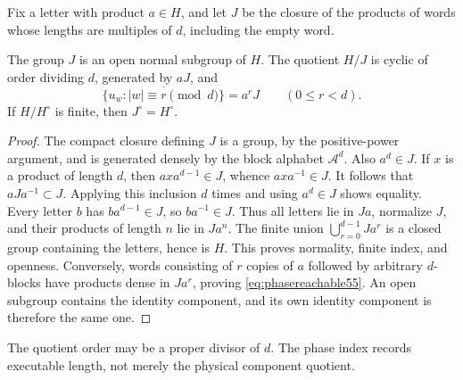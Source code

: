Fix a letter with product $a\in H$, and let $J$ be the closure of the products of words whose lengths are multiples of $d$, including the empty word.
\begin{lemma}\label{lem:phasegroup55}
The group $J$ is an open normal subgroup of $H$. The quotient $H/J$ is cyclic of order dividing $d$, generated by $aJ$, and
\begin{equation}\label{eq:phasereachable55}
 \overline{\{u_w:|w|\equiv r\pmod d\}}=a^rJ
 \qquad(0\le r<d).
\end{equation}
If $H/H^\circ$ is finite, then $J^\circ=H^\circ$.
\end{lemma}
\begin{proof}
The compact closure defining $J$ is a group, by the positive-power argument, and is generated densely by the block alphabet $\mathcal A^d$. Also $a^d\in J$. If $x$ is a product of length $d$, then $axa^{d-1}\in J$, whence $axa^{-1}\in J$. It follows that $aJa^{-1}\subset J$. Applying this inclusion $d$ times and using $a^d\in J$ shows equality. Every letter $b$ has $ba^{d-1}\in J$, so $ba^{-1}\in J$. Thus all letters lie in $Ja$, normalize $J$, and their products of length $n$ lie in $Ja^n$. The finite union $\bigcup_{r=0}^{d-1}Ja^r$ is a closed group containing the letters, hence is $H$. This proves normality, finite index, and openness. Conversely, words consisting of $r$ copies of $a$ followed by arbitrary $d$-blocks have products dense in $Ja^r$, proving \eqref{eq:phasereachable55}. An open subgroup contains the identity component, and its own identity component is therefore the same one.
\end{proof}
The quotient order may be a proper divisor of $d$. The phase index records executable length, not merely the physical component quotient.

